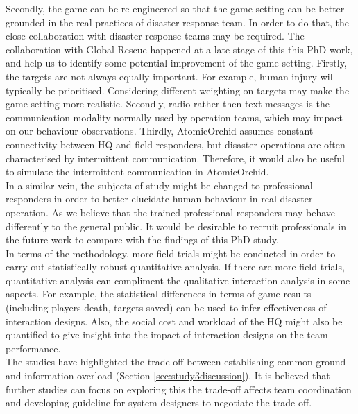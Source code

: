 Secondly, the game can be re-engineered so that the game setting can be better grounded in the real practices of disaster response team. In order to do that, the close collaboration with disaster response teams may be required. The collaboration with Global Rescue happened at a late stage of this this PhD work, and help us to identify some potential improvement of the game setting. Firstly, the targets are not always equally important. For example, human injury will typically be prioritised. Considering different weighting on targets may make the game setting more realistic. Secondly, radio rather then text messages is the communication modality normally used by operation teams, which may impact on our behaviour observations. Thirdly, AtomicOrchid assumes constant connectivity between HQ and field responders, but disaster operations are often characterised by intermittent communication. Therefore, it would also be useful to simulate the intermittent communication in AtomicOrchid.  \\

In a similar vein, the subjects of study might be changed to professional responders in order to better elucidate human behaviour in real disaster operation.  As we believe that the trained professional responders may behave differently to the general public. It would be desirable to recruit professionals in the future work to compare with the findings of this PhD study.\\

In terms of the methodology, more field trials might be conducted in order to carry out statistically robust quantitative analysis. If there are more field trials, quantitative analysis can compliment the qualitative interaction analysis in some aspects. For example, the statistical differences in terms of game results (including players death, targets saved) can be used to infer effectiveness of interaction designs. Also, the social cost and workload of the HQ might also be quantified  to give insight into the impact of interaction designs on the team performance. \\ %

The studies have highlighted the trade-off between establishing common ground and information overload (Section \ref{sec:study3discussion}). It is believed that further studies can focus on exploring this the trade-off affects team coordination and developing guideline for system designers to negotiate the trade-off. \\  

